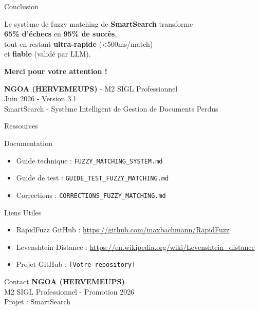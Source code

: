 \documentclass[aspectratio=169]{beamer}
\begin{document}
\begin{frame}{Conclusion}
    \begin{center}
        \Large
        Le système de fuzzy matching de \textbf{SmartSearch} transforme \\
        \textcolor{rougeErreur}{\textbf{65\% d'échecs}} en \textcolor{vertSucces}{\textbf{95\% de succès}}, \\
        tout en restant \textbf{ultra-rapide} (<500ms/match) \\
        et \textbf{fiable} (validé par LLM).

        \vspace{1cm}

        \huge
        \textbf{Merci pour votre attention !}

        \vspace{0.5cm}

        \normalsize
        \textbf{NGOA (HERVEMEUPS)} - M2 SIGL Professionnel \\
        Juin 2026 - Version 3.1 \\
        SmartSearch - Système Intelligent de Gestion de Documents Perdus
    \end{center}
\end{frame}

\begin{frame}{Ressources}
    \begin{block}{Documentation}
        \begin{itemize}
            \item Guide technique : \texttt{FUZZY\_MATCHING\_SYSTEM.md}
            \item Guide de test : \texttt{GUIDE\_TEST\_FUZZY\_MATCHING.md}
            \item Corrections : \texttt{CORRECTIONS\_FUZZY\_MATCHING.md}
        \end{itemize}
    \end{block}

    \begin{block}{Liens Utiles}
        \begin{itemize}
            \item RapidFuzz GitHub : \url{https://github.com/maxbachmann/RapidFuzz}
            \item Levenshtein Distance : \url{https://en.wikipedia.org/wiki/Levenshtein_distance}
            \item Projet GitHub : \texttt{[Votre repository]}
        \end{itemize}
    \end{block}

    \begin{block}{Contact}
        \textbf{NGOA (HERVEMEUPS)} \\
        M2 SIGL Professionnel - Promotion 2026 \\
        Projet : SmartSearch
    \end{block}
\end{frame}
\end{document}
